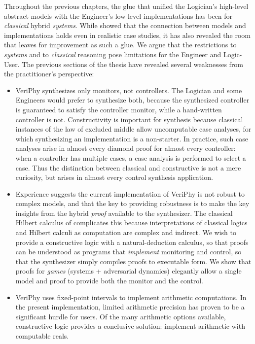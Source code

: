 \documentclass[12pt]{cmuthesis}
\theoremstyle{definition}
\theoremstyle{remark}
\newcommand{\rref}[2][]{\prettyref{#2}}
\newcommand{\VeriPhy}{VeriPhy\xspace}
\begin{document}
Throughout the previous chapters, the glue that unified the Logician's high-level abstract models with the Engineer's low-level implementations has been \dL for \emph{classical} hybrid \emph{systems}.
While \rref{ch:end-to-end-v} showed that the connection between \dL models and implementations holds even in realistic case studies, it has also revealed the room that \dL leaves for improvement as such a glue.
We argue that the restrictions to \emph{systems} and to \emph{classical} reasoning pose limitations for the Engineer and Logic-User.
The previous sections of the thesis have revealed several weaknesses from the practitioner's perspective:
\begin{itemize}
\item
\VeriPhy synthesizes only monitors, not controllers.
The Logician and some Engineers would prefer to synthesize both, because the synthesized controller is guaranteed to satisfy the controller monitor, while a hand-written controller is not.
Constructivity is important for synthesis because classical instances of the law of excluded middle allow uncomputable case analyses, for which synthesizing an implementation is a non-starter.
In practice, such case analyses arise in almost every diamond proof for almost every controller: when a controller has multiple cases, a case analysis is performed to select a case.
Thus the distinction between classical and constructive is not a mere curiosity, but arises in almost every control synthesis application.
\item
Experience suggests the current implementation of \VeriPhy is not robust to complex models, and that the key to providing robustness is to make the key insights from the hybrid \emph{proof} available to the synthesizer.
The classical Hilbert calculus of \dL complicates this because interpretations of classical logics and Hilbert calculi as computation are complex and indirect.
We wish to provide a constructive logic with a natural-deduction calculus, so that proofs can be understood as programs that \emph{implement} monitoring and control, so that the synthesizer simply compiles proofs to executable form.
We show that proofs for \emph{games} (systems + adversarial dynamics) elegantly allow a single model and proof to provide both the monitor and the control.
\item
\VeriPhy uses fixed-point intervals to implement arithmetic computations.
In the present implementation, limited arithmetic precision has proven to be a significant hurdle for users.
Of the many arithmetic options available, constructive logic provides a conclusive solution: implement arithmetic with computable reals.

\end{itemize}
\end{document}
